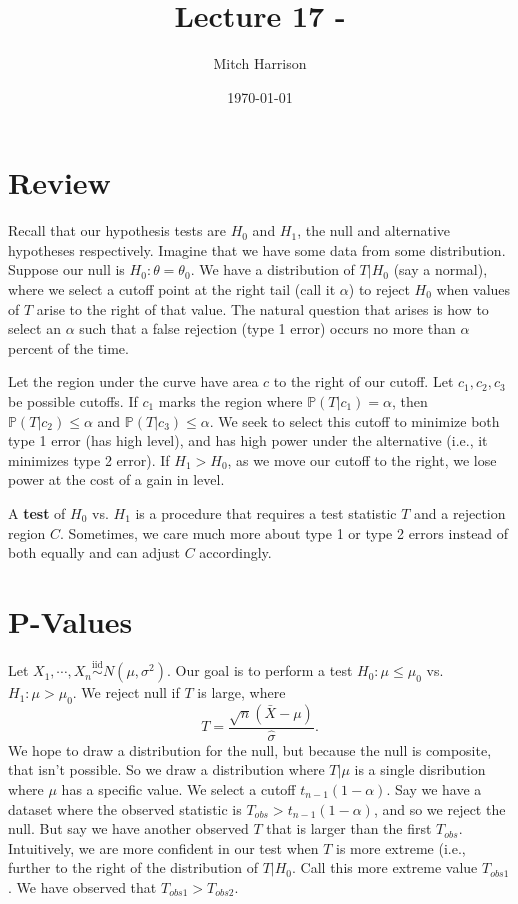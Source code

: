 \documentclass[titlepage, 12pt, leqno]{article}
\title{\Huge{Lecture 17 - }}
\author{\large{Mitch Harrison}}
\date{\today}
\begin{document}
\setlength{\parskip}{1\baselineskip}
\setlength{\parindent}{15pt}
\maketitle
\tableofcontents
\newpage


\section{Review}

Recall that our hypothesis tests are $H_{0}$ and $H_{1}$, the null and 
alternative hypotheses respectively. Imagine that we have some data from some
distribution. Suppose our null is $H_{0}: \theta = \theta_{0}$. We have a
distribution of $T|H_{0}$ (say a normal), where we select a cutoff point at
the right tail (call it $\alpha$) to reject $H_{0}$ when values of $T$ arise
to the right of that value. The natural question that arises is how to select
an $\alpha$ such that a false rejection (type 1 error) occurs no more than
$\alpha$ percent of the time.

Let the region under the curve have area $c$ to the right of our cutoff. Let
$c_{1}, c_{2}, c_{3}$ be possible cutoffs. If $c_{1}$ marks the region where
$\mathbb{P}(T|c_{1}) = \alpha$, then $\mathbb{P}(T|c_{2}) \le \alpha$ and
$\mathbb{P}(T|c_{3}) \le \alpha$. We seek to select this cutoff to minimize both
type 1 error (has high level), and has high power under the alternative (i.e.,
it minimizes type 2 error). If $H_{1} > H_{0}$, as we move our cutoff to the
right, we lose power at the cost of a gain in level.

A \textbf{test} of $H_{0}$ vs. $H_{1}$ is a procedure that requires a test
statistic $T$ and a rejection region $C$. Sometimes, we care much more about
type 1 or type 2 errors instead of both equally and can adjust $C$ accordingly.

\pagebreak
\section{P-Values}
Let $X_{1}, \cdots , X_{n} \overset{\mathrm{iid}}{\sim}N(\mu, \sigma^{2})$. Our
goal is to perform a test $H_{0}:\mu \le \mu_{0}$ vs. $H_{1}:\mu > \mu_{0}$.
We reject null if $T$ is large, where
\[
    T = \frac{\sqrt{n}(\bar X - \mu)}{\hat \sigma}.
\]
We hope to draw a distribution for the null, but because the null is composite,
that isn't possible. So we draw a distribution where $T|\mu$ is a single
disribution where $\mu$ has a specific value. We select a cutoff $t_{n-1}
(1-\alpha)$. Say we have a dataset where the observed statistic is $T_{obs} >
t_{n-1}(1-\alpha)$, and so we reject the null. But say we have another observed
$T$ that is larger than the first $T_{obs}$. Intuitively, we are more confident
in our test when $T$ is more extreme (i.e., further to the right of the 
distribution of $T|H_{0}$. Call this more extreme value $T_{obs1}$. We have
observed that $T_{obs1}>T_{obs2}$. 
\end{document}
